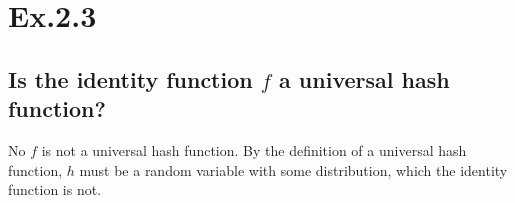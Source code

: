 \section*{Ex.2.3}
\subsection*{Is the identity function $f$ a universal hash function?}
No $f$ is not a universal hash function. By the definition of a universal hash function, $h$ must be a random variable with some distribution, which the identity function is not.
